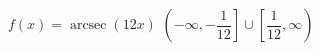  {$f(x) = \operatorname{arcsec}(12x)$}
{ $\left(-\infty, -\dfrac{1}{12}\right] \cup \left[\dfrac{1}{12}, \infty\right)$}
